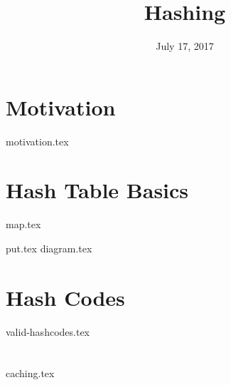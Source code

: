 \documentclass{exam}
\title{Hashing}
\date{July 17, 2017}
\begin{document}
\maketitle

\section{Motivation}
\begin{questions}
{motivation.tex}
\end{questions}

\clearpage

\section{Hash Table Basics}
{map.tex}
\begin{questions}
{put.tex}
{diagram.tex}
\end{questions}

\clearpage

\section{Hash Codes}
\begin{questions}
{valid-hashcodes.tex}
\end{questions}

\clearpage

\section{}
\begin{questions}
{caching.tex}
\end{questions}
\end{document}
